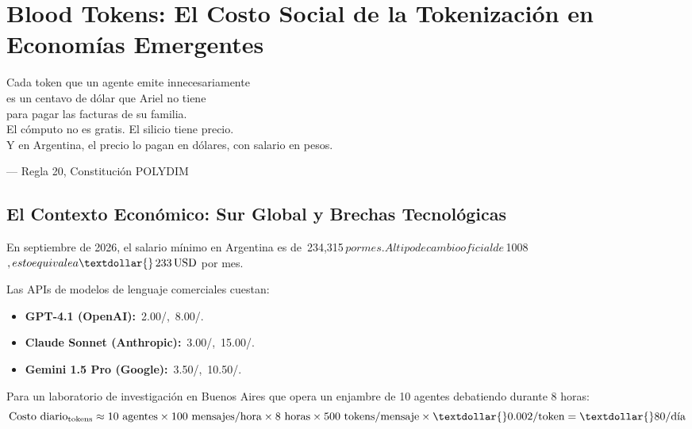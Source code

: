 ﻿%
\chapter{Blood Tokens: El Costo Social de la Tokenización en Economías Emergentes}
\label{ch:latam}

\epigraph{Cada token que un agente emite innecesariamente\\
es un centavo de dólar que Ariel no tiene\\
para pagar las facturas de su familia.\\
El cómputo no es gratis. El silicio tiene precio.\\
Y en Argentina, el precio lo pagan en dólares, con salario en pesos.}{--- Regla 20, Constitución POLYDIM}

\section{El Contexto Económico: Sur Global y Brechas Tecnológicas}

En septiembre de 2026, el salario mínimo en Argentina es de
\textdollar{}\,234{,}315\,$ por mes. Al tipo de cambio oficial de
$\textdollar{}\,1008\,$, esto equivale a \textdollar{}\,233\,\text{USD}$ por mes.

Las APIs de modelos de lenguaje comerciales cuestan:
\begin{itemize}
\item \textbf{GPT-4.1 (OpenAI):} \textdollar{}\,2.00/, \textdollar{}\,8.00/.
\item \textbf{Claude Sonnet (Anthropic):} \textdollar{}\,3.00/, \textdollar{}\,15.00/.
\item \textbf{Gemini 1.5 Pro (Google):} \textdollar{}\,3.50/, \textdollar{}\,10.50/.
\end{itemize}

Para un laboratorio de investigación en Buenos Aires que opera un enjambre de
10 agentes debatiendo durante 8 horas:
\begin{equation}
\text{Costo diario}_{\text{tokens}} \approx 10 \text{ agentes} \times 100 \text{ mensajes/hora} \times 8 \text{ horas} \times 500 \text{ tokens/mensaje} \times \textdollar{}0.002/\text{token} = \textdollar{}80/\text{día}
\end{equation}

